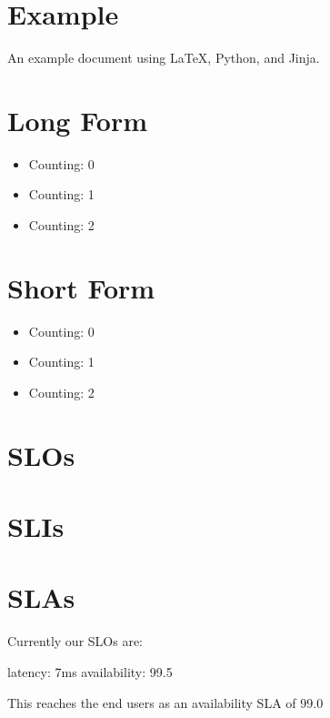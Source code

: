 \documentclass{article}
\begin{document}
\section{Example}
An example document using \LaTeX, Python, and Jinja.

\section{Long Form}
\begin{itemize}
  \item Counting: 0
  \item Counting: 1
  \item Counting: 2
\end{itemize}

\section{Short Form}

\begin{itemize}
  \item Counting: 0
  \item Counting: 1
  \item Counting: 2
\end{itemize}

\section{SLOs}
\section{SLIs}
\section{SLAs}

Currently our SLOs are:

latency: 7ms
availability: 99.5%

This reaches the end users as an availability SLA of 99.0%
\end{document}
